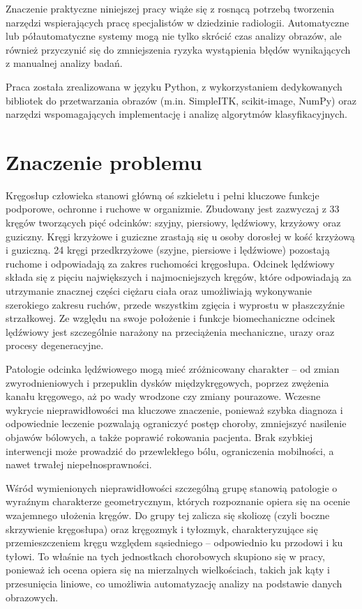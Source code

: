 Znaczenie praktyczne niniejszej pracy wiąże się z rosnącą potrzebą tworzenia narzędzi wspierających pracę specjalistów w dziedzinie radiologii. Automatyczne lub półautomatyczne systemy mogą nie tylko skrócić czas analizy obrazów, ale również przyczynić się do zmniejszenia ryzyka wystąpienia błędów wynikających z manualnej analizy badań.

Praca została zrealizowana w języku Python, z wykorzystaniem dedykowanych bibliotek do przetwarzania obrazów (m.in. SimpleITK, scikit-image, NumPy) oraz narzędzi wspomagających implementację i analizę algorytmów klasyfikacyjnych.

\section{Znaczenie problemu}
Kręgosłup człowieka stanowi główną oś szkieletu i pełni kluczowe funkcje podporowe, ochronne  i ruchowe w organizmie.
Zbudowany jest zazwyczaj z 33 kręgów tworzących pięć odcinków: szyjny, piersiowy, lędźwiowy, krzyżowy oraz guziczny. Kręgi krzyżowe i guziczne zrastają się u osoby dorosłej w kość krzyżową i guziczną.
24 kręgi przedkrzyżowe (szyjne, piersiowe i lędźwiowe) pozostają ruchome i odpowiadają za zakres ruchomości kręgosłupa.
Odcinek lędźwiowy składa się z pięciu największych i najmocniejszych kręgów, które odpowiadają za utrzymanie znacznej części ciężaru ciała oraz umożliwiają wykonywanie szerokiego zakresu ruchów, przede wszystkim zgięcia i wyprostu w płaszczyźnie strzałkowej.
Ze względu na swoje położenie i funkcje biomechaniczne odcinek lędźwiowy jest szczególnie narażony na przeciążenia mechaniczne, urazy oraz procesy degeneracyjne.

Patologie odcinka lędźwiowego mogą mieć zróżnicowany charakter -- od zmian zwyrodnieniowych i przepuklin dysków międzykręgowych, poprzez zwężenia kanału kręgowego, aż po wady wrodzone czy zmiany pourazowe.
Wczesne wykrycie nieprawidłowości ma kluczowe znaczenie, ponieważ szybka diagnoza i odpowiednie leczenie pozwalają ograniczyć postęp choroby, zmniejszyć nasilenie objawów bólowych, a także poprawić rokowania pacjenta.
Brak szybkiej interwencji może prowadzić do przewlekłego bólu, ograniczenia mobilności, a nawet trwałej niepełnosprawności.

Wśród wymienionych nieprawidłowości szczególną grupę stanowią patologie o wyraźnym charakterze geometrycznym, których rozpoznanie opiera się na ocenie wzajemnego ułożenia kręgów.
Do grupy tej zalicza się skoliozę (czyli boczne skrzywienie kręgosłupa) oraz kręgozmyk i tyłozmyk, charakteryzujące się przemieszczeniem kręgu względem sąsiedniego -- odpowiednio ku przodowi i ku tyłowi.
To właśnie na tych jednostkach chorobowych skupiono się w pracy, ponieważ ich ocena opiera się na mierzalnych wielkościach, takich jak kąty i przesunięcia liniowe, co umożliwia automatyzację analizy na podstawie danych obrazowych.

